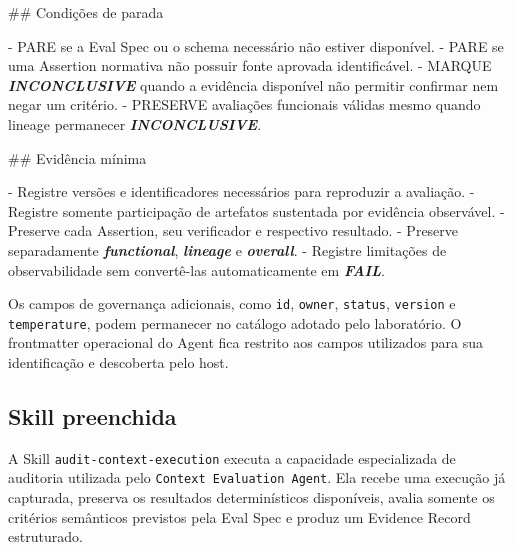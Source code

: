 \documentclass[
  10pt,
  a4paper,
  oneside]{book}
\newenvironment{Shaded}{}{}
\newcommand{\FunctionTok}[1]{\textcolor[rgb]{0.02,0.16,0.49}{#1}}
\newcommand{\InformationTok}[1]{\textcolor[rgb]{0.38,0.63,0.69}{\textbf{\textit{#1}}}}
\newcommand{\NormalTok}[1]{#1}
\newcommand{\SpecialStringTok}[1]{\textcolor[rgb]{0.73,0.40,0.53}{#1}}
\renewenvironment{Shaded}{\begin{snugshade}}{\end{snugshade}}%
\begin{document}
\begin{Shaded}
\begin{Highlighting}[]
\FunctionTok{\#\# Condições de parada}

\SpecialStringTok{{-} }\NormalTok{PARE se a Eval Spec ou o schema necessário não estiver disponível.}
\SpecialStringTok{{-} }\NormalTok{PARE se uma Assertion normativa não possuir fonte aprovada identificável.}
\SpecialStringTok{{-} }\NormalTok{MARQUE }\InformationTok{\textasciigrave{}INCONCLUSIVE\textasciigrave{}}\NormalTok{ quando a evidência disponível não permitir confirmar nem negar um critério.}
\SpecialStringTok{{-} }\NormalTok{PRESERVE avaliações funcionais válidas mesmo quando lineage permanecer }\InformationTok{\textasciigrave{}INCONCLUSIVE\textasciigrave{}}\NormalTok{.}

\FunctionTok{\#\# Evidência mínima}

\SpecialStringTok{{-} }\NormalTok{Registre versões e identificadores necessários para reproduzir a avaliação.}
\SpecialStringTok{{-} }\NormalTok{Registre somente participação de artefatos sustentada por evidência observável.}
\SpecialStringTok{{-} }\NormalTok{Preserve cada Assertion, seu verificador e respectivo resultado.}
\SpecialStringTok{{-} }\NormalTok{Preserve separadamente }\InformationTok{\textasciigrave{}functional\textasciigrave{}}\NormalTok{, }\InformationTok{\textasciigrave{}lineage\textasciigrave{}}\NormalTok{ e }\InformationTok{\textasciigrave{}overall\textasciigrave{}}\NormalTok{.}
\SpecialStringTok{{-} }\NormalTok{Registre limitações de observabilidade sem convertê{-}las automaticamente em }\InformationTok{\textasciigrave{}FAIL\textasciigrave{}}\NormalTok{.}
\end{Highlighting}
\end{Shaded}

Os campos de governança adicionais, como \texttt{id}, \texttt{owner},
\texttt{status}, \texttt{version} e \texttt{temperature}, podem
permanecer no catálogo adotado pelo laboratório. O frontmatter
operacional do Agent fica restrito aos campos utilizados para sua
identificação e descoberta pelo host.

\hypertarget{skill-preenchida}{%
\subsection{Skill preenchida}\label{skill-preenchida}}

A Skill \texttt{audit-context-execution} executa a capacidade
especializada de auditoria utilizada pelo
\texttt{Context\ Evaluation\ Agent}. Ela recebe uma execução já
capturada, preserva os resultados determinísticos disponíveis, avalia
somente os critérios semânticos previstos pela Eval Spec e produz um
Evidence Record estruturado.
\end{document}
